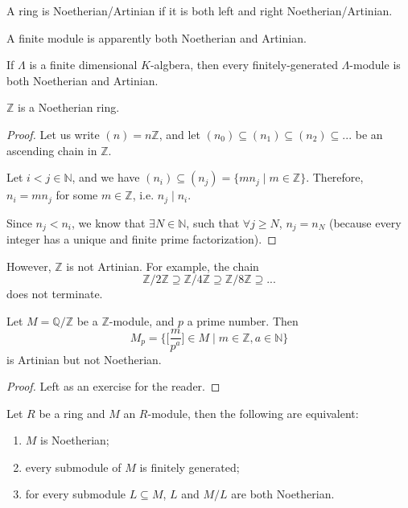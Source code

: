 \documentclass[12pt, a4paper, titlepage]{report}
\begin{document}
\begin{defn}
  A ring is Noetherian/Artinian if it is both left and right Noetherian/Artinian.
\end{defn}

\begin{rem}
  A finite module is apparently both Noetherian and Artinian.
\end{rem}

\begin{prop}
  If $\Lambda$ is a finite dimensional $K$-algbera, then every finitely-generated $\Lambda$-module is both Noetherian and Artinian.
\end{prop}

\begin{prop}
  $\mathbb{Z}$ is a Noetherian ring.
\end{prop}

\begin{proof}
  Let us write $(n) = n\mathbb{Z}$, and let $(n_0) \subseteq (n_1) \subseteq (n_2) \subseteq ...$ be an ascending chain in $\mathbb{Z}$.

  Let $i < j \in \mathbb{N}$, and we have $(n_i) \subseteq (n_j) = \{ mn_j \mid m \in \mathbb{Z} \}$. Therefore, $n_i = mn_j$ for some $m \in \mathbb{Z}$,
  i.e. $n_j \mid n_i$.

  Since $n_j < n_i$, we know that $\exists N \in \mathbb{N}$, such that $\forall j \geq N$, $n_j = n_N$ (because every integer has a unique and finite
  prime factorization).
\end{proof}

\begin{rem}
  However, $\mathbb{Z}$ is not Artinian. For example, the chain
  \[
    \mathbb{Z}/2\mathbb{Z} \supseteq \mathbb{Z}/4\mathbb{Z} \supseteq \mathbb{Z}/8\mathbb{Z} \supseteq ...
  \]
  does not terminate.
\end{rem}

\begin{exmp}
  Let $M = \mathbb{Q}/\mathbb{Z}$ be a $\mathbb{Z}$-module, and $p$ a prime number. Then
  \[
    M_p = \big\{ \big[ \frac{m}{p^a} \big] \in M \mid m \in \mathbb{Z}, a \in \mathbb{N} \big\}
  \]
  is Artinian but not Noetherian.
\end{exmp}

\begin{proof} Left as an exercise for the reader. \end{proof}

\begin{lem}
  Let $R$ be a ring and $M$ an $R$-module, then the following are equivalent:

  \begin{enumerate}
  \item $M$ is Noetherian;
  \item every submodule of $M$ is finitely generated;
  \item for every submodule $L \subseteq M$, $L$ and $M/L$ are both Noetherian.
  \end{enumerate}
\end{lem}
\end{document}
